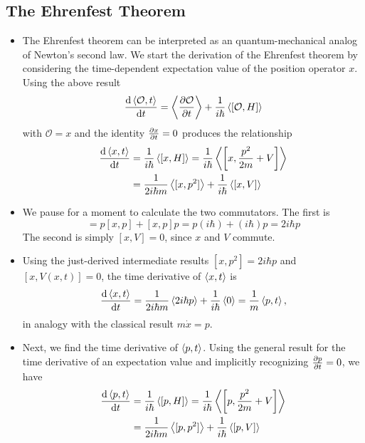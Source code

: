 \documentclass[11pt, a4paper]{article}
\renewcommand{\O}{\mathcal{O}}  %
\begin{document}
\subsection{The Ehrenfest Theorem}
\begin{itemize}
	\item The Ehrenfest theorem can be interpreted as an quantum-mechanical analog of Newton's second law. We start the derivation of the Ehrenfest theorem by considering the time-dependent expectation value of the position operator $ x $.  Using the above result 
	\begin{equation*}
		\dv{\ev{\O, t}}{t} =  \ev{\pdv{\O}{t}} + \frac{1}{i\hbar}\ev{[\O, H]}
	\end{equation*}
	with $ \O = x $ and the identity $ \pdv{x}{t} = 0 $ produces the relationship
	\begin{align*}
		\dv{\ev{x, t}}{t} &= \frac{1}{i\hbar}\ev{[x, H]} = \frac{1}{i\hbar}\ev{\left[x, \frac{p^{2}}{2m} + V\right]}\\
		& = \frac{1}{2i\hbar m} \ev{[x, p^{2}]} + \frac{1}{i\hbar}\ev{[x, V]}
	\end{align*}
	
	\item We pause for a moment to calculate the two commutators. The first is
	\begin{equation*}
		[x, p^{2}] = p[x, p] + [x, p]p = p(i\hbar) + (i\hbar) p = 2i \hbar p
	\end{equation*}
	The second is simply $ [x, V] = 0 $, since $ x $ and $ V $ commute. 
	
	\item Using the just-derived intermediate results $ [x, p^{2}] = 2i\hbar p $ and $ [x, V(x, t)] = 0 $, the time derivative of $ \ev{x, t} $ is 
	\begin{equation*}
		\dv{\ev{x, t}}{t} = \frac{1}{2i\hbar m} \ev{2 i\hbar p} + \frac{1}{i\hbar}\ev{0} = \frac{1}{m}\ev{p, t},
	\end{equation*}
	in analogy with the classical result $ m \dot{x} = p $. 
	
	\item Next, we find the time derivative of $ \ev{p, t} $. Using the general result for the time derivative of an expectation value and implicitly recognizing $ \pdv{p}{t} = 0 $, we have
	\begin{align*}
		\dv{\ev{p, t}}{t} &= \frac{1}{i\hbar}\ev{[p, H]} = \frac{1}{i\hbar}\ev{\left[p, \frac{p^{2}}{2m} + V\right]}\\
		&= \frac{1}{2i \hbar m}\ev{[p, p^{2}]} + \frac{1}{i\hbar} \ev{[p, V]}
	\end{align*}
	

\end{itemize}
\end{document}
